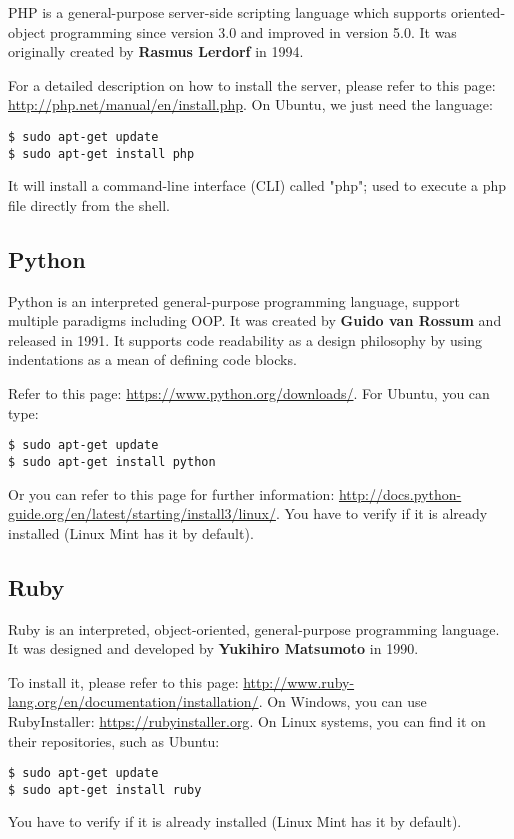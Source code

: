 \documentclass{KBook}
\begin{document}
PHP is a general-purpose server-side scripting language which supports oriented-object programming since version 3.0  and improved in version 5.0.
It was originally created by \textbf{Rasmus Lerdorf} in 1994. 

For a detailed description on how to install the server, please refer to this page: \url{http://php.net/manual/en/install.php}.
On Ubuntu, we just need the language:
\begin{lstlisting}[style=shellStyle]
$ sudo apt-get update
$ sudo apt-get install php
\end{lstlisting}
It will install a command-line interface (CLI) called "php"; used to execute a php file directly from the shell.

\subsection{Python}

Python is an interpreted general-purpose programming language, support multiple paradigms including OOP. 
It was created by \textbf{Guido van Rossum} and released in 1991.
It supports code readability as a design philosophy by using indentations as a mean of defining code blocks.

Refer to this page: \url{https://www.python.org/downloads/}. 
For Ubuntu, you can type:
\begin{lstlisting}[style=shellStyle]
$ sudo apt-get update
$ sudo apt-get install python
\end{lstlisting}
Or you can refer to this page for further information: \url{http://docs.python-guide.org/en/latest/starting/install3/linux/}.
You have to verify if it is already installed (Linux Mint has it by default).

\subsection{Ruby}

Ruby is an interpreted, object-oriented, general-purpose programming language. 
It was designed and developed by \textbf{Yukihiro Matsumoto} in 1990.

To install it, please refer to this page: \url{http://www.ruby-lang.org/en/documentation/installation/}. 
On Windows, you can use RubyInstaller: \url{https://rubyinstaller.org}.
On Linux systems, you can find it on their repositories, such as Ubuntu:
\begin{lstlisting}[style=shellStyle]
$ sudo apt-get update
$ sudo apt-get install ruby
\end{lstlisting}
You have to verify if it is already installed (Linux Mint has it by default).
\end{document}
